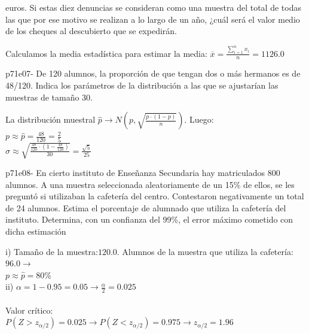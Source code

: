 \documentclass[spanish, 11pt]{exam}
\begin{document}
\begin{questions}
euros. Si estas diez denuncias se consideran como una muestra del total de todas las que por ese motivo se
realizan a lo largo de un año, ¿cuál será el valor medio de los cheques al descubierto que se expedirán. \begin{solution}   Calculamos la media estadística para estimar la media: $\overline{x}=\frac{{\sum_{i=1}^n x_i }}{n} =1126.0$ \\   \end{solution}\question p71e07- De 120 alumnos, la proporción de que tengan dos o más hermanos es de 48/120. Indica los parámetros de la
distribución a las que se ajustarían las muestras de tamaño 30. \begin{solution}   La distribución muestral $\widehat{p} \rightarrow N \left ( p , \sqrt{ \frac{p \cdot (1-p)} {n}}\right )$. Luego: \\ $p \approx \widehat{p}=\frac{48}{120}=\frac{2}{5}$ \\ $\sigma \approx \sqrt{\frac{\frac{48}{120}\cdot \left(1-\frac{48}{120}\right)}{30}}=\frac{\sqrt{5}}{25}$ \\    \end{solution}\question p71e08- En cierto instituto de Enseñanza Secundaria hay matriculados 800 alumnos. A una muestra seleccionada
aleatoriamente de un 15\% de ellos, se les preguntó si utilizaban la cafetería del centro. Contestaron
negativamente un total de 24 alumnos. Estima el porcentaje de alumnado que utiliza la cafetería del instituto.
Determina, con un confianza del 99\%, el error máximo cometido con dicha estimación \begin{solution}   i) Tamaño de la muestra:$120.0$. Alumnos de la muestra que utiliza la cafetería: $96.0\to $ \\ $p \approx \widehat{p} =80$\% \\ ii) $\alpha=1-0.95=0.05\to \frac{\alpha}{2}=0.025$ \\ \\ Valor crítico: \\ $P(Z>z_{\alpha/2})=0.025\to P(Z<z_{\alpha/2})=0.975 \to z_{\alpha/2} =1.96$ \\ 
\end{solution}
\end{questions}
\end{document}
